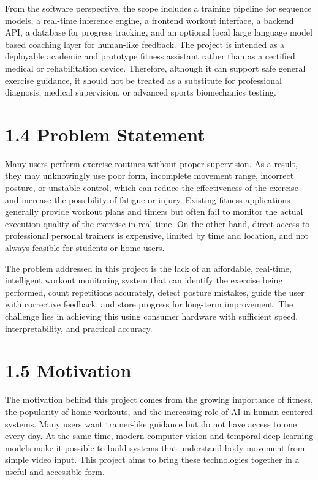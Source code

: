 \documentclass[12pt,a4paper]{report}
\begin{document}
From the software perspective, the scope includes a training pipeline for sequence models, a real-time inference engine, a frontend workout interface, a backend API, a database for progress tracking, and an optional local large language model based coaching layer for human-like feedback. The project is intended as a deployable academic and prototype fitness assistant rather than as a certified medical or rehabilitation device. Therefore, although it can support safe general exercise guidance, it should not be treated as a substitute for professional diagnosis, medical supervision, or advanced sports biomechanics testing.

\section{1.4 Problem Statement}
Many users perform exercise routines without proper supervision. As a result, they may unknowingly use poor form, incomplete movement range, incorrect posture, or unstable control, which can reduce the effectiveness of the exercise and increase the possibility of fatigue or injury. Existing fitness applications generally provide workout plans and timers but often fail to monitor the actual execution quality of the exercise in real time. On the other hand, direct access to professional personal trainers is expensive, limited by time and location, and not always feasible for students or home users.

The problem addressed in this project is the lack of an affordable, real-time, intelligent workout monitoring system that can identify the exercise being performed, count repetitions accurately, detect posture mistakes, guide the user with corrective feedback, and store progress for long-term improvement. The challenge lies in achieving this using consumer hardware with sufficient speed, interpretability, and practical accuracy.

\section{1.5 Motivation}
The motivation behind this project comes from the growing importance of fitness, the popularity of home workouts, and the increasing role of AI in human-centered systems. Many users want trainer-like guidance but do not have access to one every day. At the same time, modern computer vision and temporal deep learning models make it possible to build systems that understand body movement from simple video input. This project aims to bring these technologies together in a useful and accessible form.
\end{document}
